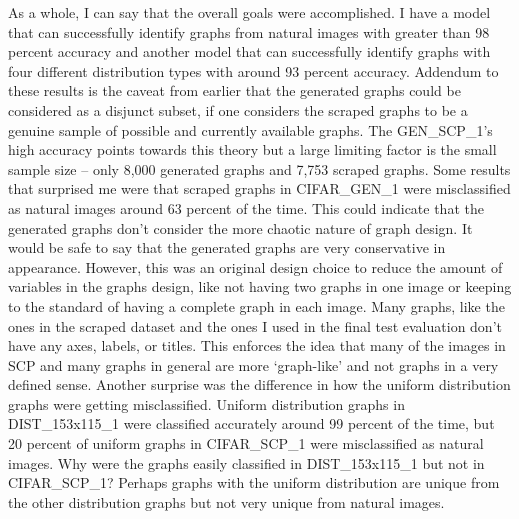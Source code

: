 \documentclass[12pt]{article}
\begin{document}
       
            As a whole, I can say that the overall goals were accomplished. 
            I have a model that can successfully identify graphs from natural images 
            with greater than 98 percent accuracy and another model that can successfully identify graphs 
            with four different distribution types with around 93 percent accuracy. 
            Addendum to these results is the caveat from earlier that the generated graphs could be considered as a disjunct subset, 
            if one considers the scraped graphs to be a genuine sample of possible and currently available graphs. 
            The GEN\_SCP\_1’s high accuracy points towards this theory but a large limiting factor is the small sample size -- 
            only 8,000 generated graphs and 7,753 scraped graphs. 
            Some results that surprised me were that scraped graphs in CIFAR\_GEN\_1 were misclassified as natural images 
            around 63 percent of the time. This could indicate 
            that the generated graphs don’t consider the more chaotic nature of graph design. 
            It would be safe to say that the generated graphs are very conservative in appearance. 
            However, this was an original design choice to reduce the amount of variables in the graphs design, 
            like not having two graphs in one image or keeping to the standard of having a complete graph in each image. 
            Many graphs, like the ones in the scraped dataset 
            and the ones I used in the final test evaluation don’t have any axes, labels, or titles. 
            This enforces the idea that many of the images in SCP and many graphs in general are more ‘graph-like’ 
            and not graphs in a very defined sense.
            Another surprise was the difference in how the uniform distribution graphs were getting misclassified.
            Uniform distribution graphs in DIST\_153x115\_1 were classified accurately around 99 percent of the time, 
            but 20 percent of uniform graphs in CIFAR\_SCP\_1 were misclassified as natural images. 
            Why were the graphs easily classified in DIST\_153x115\_1 but not in CIFAR\_SCP\_1? 
            Perhaps graphs with the uniform distribution are unique from the other distribution graphs but not very unique from natural images.
            
\end{document}
